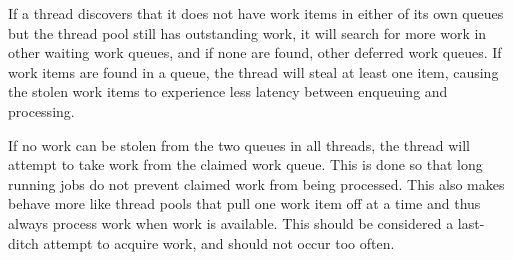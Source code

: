 If a thread discovers that it does not have work items in either of
its own queues but the thread pool still has outstanding work, it will
search for more work in other waiting work queues, and if none are
found, other deferred work queues. If work items are found in a queue,
the thread will steal at least one item, causing the stolen work items
to experience less latency between enqueuing and processing.

If no work can be stolen from the two queues in all threads, the
thread will attempt to take work from the claimed work queue. This is
done so that long running jobs do not prevent claimed work from being
processed. This also makes \qptp behave more like thread pools that
pull one work item off at a time and thus always process work when
work is available. This should be considered a last-ditch attempt to
acquire work, and should not occur too often.

